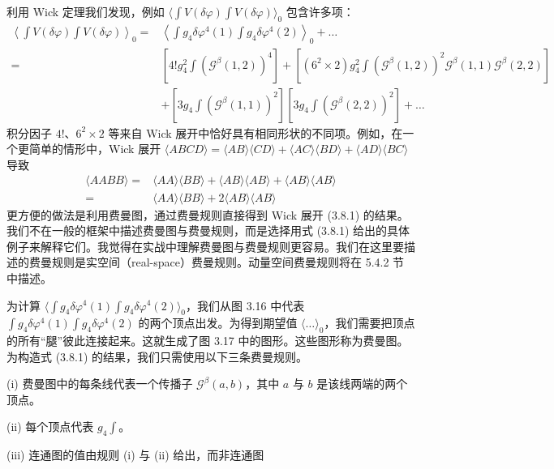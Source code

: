 利用 Wick 定理我们发现，例如 $\big\langle\int V(\delta\varphi)\int V(\delta\varphi)\big\rangle_{0}$ 包含许多项：
\begin{align*}
\left\langle\int V(\delta\varphi)\int V(\delta\varphi)\right\rangle_{0} ={}& \left\langle\int g_{4}\delta\varphi^{4}(1)\int g_{4}\delta\varphi^{4}(2)\right\rangle_{0} + \dots\\
={}& \left[4!g_{4}^{2}\int\left(\mathcal{G}^{\beta}(1,2)\right)^{4}\right] + \left[(6^{2}\times 2)g_{4}^{2}\int\left(\mathcal{G}^{\beta}(1,2)\right)^{2}\mathcal{G}^{\beta}(1,1)\mathcal{G}^{\beta}(2,2)\right]\\
&+ \left[3g_{4}\int\left(\mathcal{G}^{\beta}(1,1)\right)^{2}\right]\left[3g_{4}\int\left(\mathcal{G}^{\beta}(2,2)\right)^{2}\right] + \dots \tag{3.8.1}
\end{align*}
积分因子 $4!$、$6^{2}\times2$ 等来自 Wick 展开中恰好具有相同形状的不同项。例如，在一个更简单的情形中，Wick 展开 $\langle ABCD\rangle=\langle AB\rangle\langle CD\rangle+\langle AC\rangle\langle BD\rangle+\langle AD\rangle\langle BC\rangle$ 导致
\begin{align*}
\langle AABB\rangle ={}& \langle AA\rangle\langle BB\rangle + \langle AB\rangle\langle AB\rangle + \langle AB\rangle\langle AB\rangle\\
={}& \langle AA\rangle\langle BB\rangle + 2\langle AB\rangle\langle AB\rangle
\end{align*}
更方便的做法是利用费曼图，通过费曼规则直接得到 Wick 展开 (3.8.1) 的结果。我们不在一般的框架中描述费曼图与费曼规则，而是选择用式 (3.8.1) 给出的具体例子来解释它们。我觉得在实战中理解费曼图与费曼规则更容易。我们在这里要描述的费曼规则是实空间（real-space）费曼规则。动量空间费曼规则将在 5.4.2 节中描述。

为计算 $\big\langle\int g_{4}\delta\varphi^{4}(1)\int g_{4}\delta\varphi^{4}(2)\big\rangle_{0}$，我们从图 3.16 中代表 $\int g_{4}\delta\varphi^{4}(1)\int g_{4}\delta\varphi^{4}(2)$ 的两个顶点出发。为得到期望值 $\langle\dots\rangle_{0}$，我们需要把顶点的所有“腿”彼此连接起来。这就生成了图 3.17 中的图形。这些图形称为费曼图。为构造式 (3.8.1) 的结果，我们只需使用以下三条费曼规则。

(i) 费曼图中的每条线代表一个传播子 $\mathcal{G}^{\beta}(a,b)$，其中 $a$ 与 $b$ 是该线两端的两个顶点。

(ii) 每个顶点代表 $g_{4}\int$。

(iii) 连通图的值由规则 (i) 与 (ii) 给出，而非连通图


